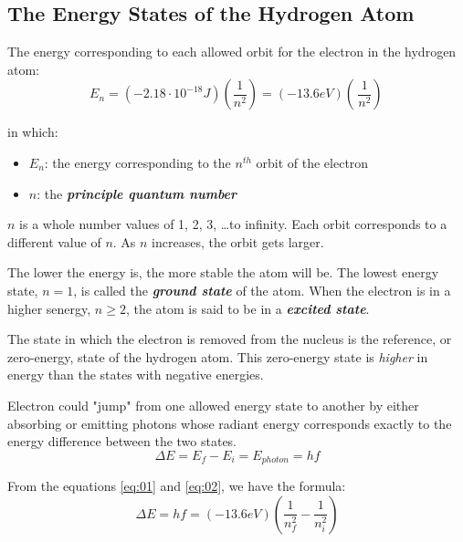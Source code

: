 \documentclass[12pt, a4paper]{report}
\newcommand{\impt}[1]{\textbf{\textit{#1}}}
\newcommand{\hii}{\subsection}
\newcommand{\mul}{\cdot}
\begin{document}
    \hii{The Energy States of the Hydrogen Atom}
        \par The energy corresponding to each allowed orbit for the electron in the hydrogen atom:
        \begin{equation} \label{eq:01}
            E_{n} = (-2.18 \mul 10^{-18} J)(\dfrac{1}{n^{2}}) = (-13.6 eV)(\,\dfrac{1}{n^2})\,
        \end{equation}
        \par in which:
        \begin{itemize}
            \item $E_{n}$: the energy corresponding to the $n^{th}$ orbit of the electron
            \item $n$: the \impt{principle quantum number}
        \end{itemize}
        \par $n$ is a whole number values of 1, 2, 3, \ldots to infinity. Each orbit corresponds
            to a different value of $n$. As $n$ increases, the orbit gets larger.
        \par The lower the energy is, the more stable the atom will be. The lowest energy state,
            $n = 1$, is called the \impt{ground state} of the atom. When the electron is in a higher
            senergy, $n \geq 2$, the atom is said to be in a \impt{excited state}.
        \par The state in which the electron is removed from the nucleus is the reference, or
            zero-energy, state of the hydrogen atom. This zero-energy state is \textit{higher} in
            energy than the states with negative energies.
        \par Electron could "jump" from one allowed energy state to another by either absorbing
        or emitting photons whose radiant energy corresponds exactly to the energy difference
        between the two states.
        \begin{equation} \label{eq:02}
            \Delta E = E_{f} - E_{i} = E_{photon} = hf
        \end{equation}
        \par From the equations \eqref{eq:01} and \eqref{eq:02}, we have the formula:
        \begin{equation}
            \Delta E = hf = (-13.6 eV)(\dfrac{1}{n_{f}^2} - \dfrac{1}{n_{i}^2})
        \end{equation}
\end{document}
